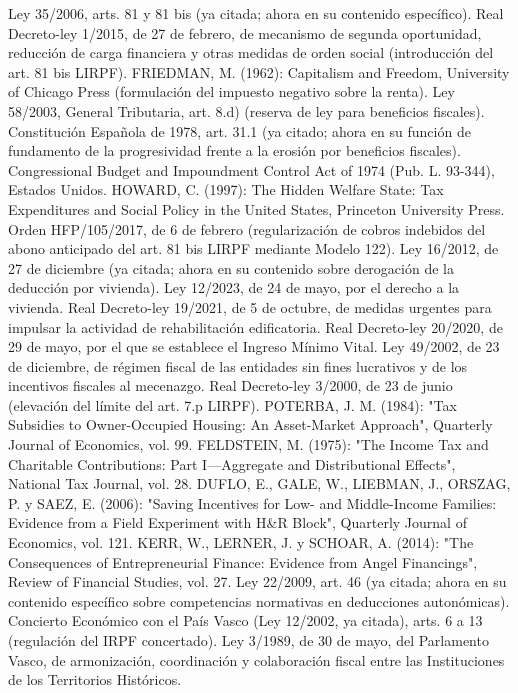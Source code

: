 \documentclass[10pt,a4paper]{article}
\begin{document}
Ley 35/2006, arts. 81 y 81 bis (ya citada; ahora en su contenido específico).
Real Decreto-ley 1/2015, de 27 de febrero, de mecanismo de segunda oportunidad, reducción de carga financiera y otras medidas de orden social (introducción del art. 81 bis LIRPF).
FRIEDMAN, M. (1962): Capitalism and Freedom, University of Chicago Press (formulación del impuesto negativo sobre la renta).
Ley 58/2003, General Tributaria, art. 8.d) (reserva de ley para beneficios fiscales).
Constitución Española de 1978, art. 31.1 (ya citado; ahora en su función de fundamento de la progresividad frente a la erosión por beneficios fiscales).
Congressional Budget and Impoundment Control Act of 1974 (Pub. L. 93-344), Estados Unidos.
HOWARD, C. (1997): The Hidden Welfare State: Tax Expenditures and Social Policy in the United States, Princeton University Press.
Orden HFP/105/2017, de 6 de febrero (regularización de cobros indebidos del abono anticipado del art. 81 bis LIRPF mediante Modelo 122).
Ley 16/2012, de 27 de diciembre (ya citada; ahora en su contenido sobre derogación de la deducción por vivienda).
Ley 12/2023, de 24 de mayo, por el derecho a la vivienda.
Real Decreto-ley 19/2021, de 5 de octubre, de medidas urgentes para impulsar la actividad de rehabilitación edificatoria.
Real Decreto-ley 20/2020, de 29 de mayo, por el que se establece el Ingreso Mínimo Vital.
Ley 49/2002, de 23 de diciembre, de régimen fiscal de las entidades sin fines lucrativos y de los incentivos fiscales al mecenazgo.
Real Decreto-ley 3/2000, de 23 de junio (elevación del límite del art. 7.p LIRPF).
POTERBA, J. M. (1984): "Tax Subsidies to Owner-Occupied Housing: An Asset-Market Approach", Quarterly Journal of Economics, vol. 99.
FELDSTEIN, M. (1975): "The Income Tax and Charitable Contributions: Part I—Aggregate and Distributional Effects", National Tax Journal, vol. 28.
DUFLO, E., GALE, W., LIEBMAN, J., ORSZAG, P. y SAEZ, E. (2006): "Saving Incentives for Low- and Middle-Income Families: Evidence from a Field Experiment with H\&R Block", Quarterly Journal of Economics, vol. 121.
KERR, W., LERNER, J. y SCHOAR, A. (2014): "The Consequences of Entrepreneurial Finance: Evidence from Angel Financings", Review of Financial Studies, vol. 27.
Ley 22/2009, art. 46 (ya citada; ahora en su contenido específico sobre competencias normativas en deducciones autonómicas).
Concierto Económico con el País Vasco (Ley 12/2002, ya citada), arts. 6 a 13 (regulación del IRPF concertado).
Ley 3/1989, de 30 de mayo, del Parlamento Vasco, de armonización, coordinación y colaboración fiscal entre las Instituciones de los Territorios Históricos.
\end{document}
